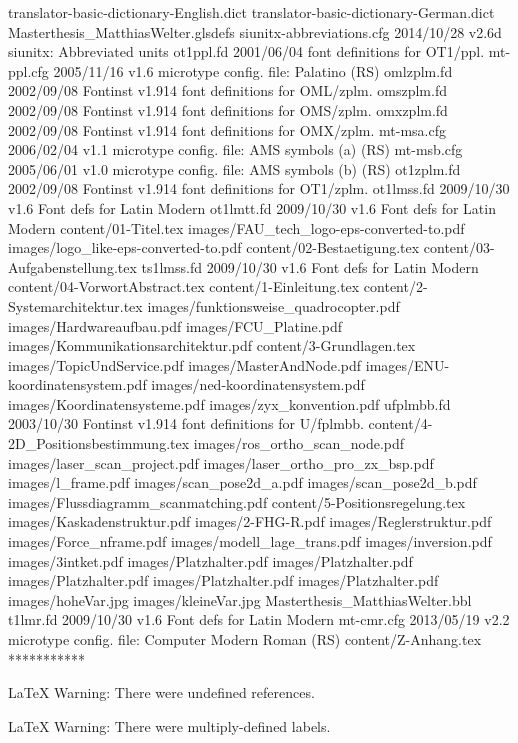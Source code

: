 translator-basic-dictionary-English.dict    
translator-basic-dictionary-German.dict    
Masterthesis_MatthiasWelter.glsdefs
siunitx-abbreviations.cfg    2014/10/28 v2.6d siunitx: Abbreviated units
  ot1ppl.fd    2001/06/04 font definitions for OT1/ppl.
  mt-ppl.cfg    2005/11/16 v1.6 microtype config. file: Palatino (RS)
 omlzplm.fd    2002/09/08 Fontinst v1.914 font definitions for OML/zplm.
 omszplm.fd    2002/09/08 Fontinst v1.914 font definitions for OMS/zplm.
 omxzplm.fd    2002/09/08 Fontinst v1.914 font definitions for OMX/zplm.
  mt-msa.cfg    2006/02/04 v1.1 microtype config. file: AMS symbols (a) (RS)
  mt-msb.cfg    2005/06/01 v1.0 microtype config. file: AMS symbols (b) (RS)
 ot1zplm.fd    2002/09/08 Fontinst v1.914 font definitions for OT1/zplm.
 ot1lmss.fd    2009/10/30 v1.6 Font defs for Latin Modern
 ot1lmtt.fd    2009/10/30 v1.6 Font defs for Latin Modern
content/01-Titel.tex
images/FAU_tech_logo-eps-converted-to.pdf
images/logo_like-eps-converted-to.pdf
content/02-Bestaetigung.tex
content/03-Aufgabenstellung.tex
 ts1lmss.fd    2009/10/30 v1.6 Font defs for Latin Modern
content/04-VorwortAbstract.tex
content/1-Einleitung.tex
content/2-Systemarchitektur.tex
images/funktionsweise_quadrocopter.pdf
images/Hardwareaufbau.pdf
images/FCU_Platine.pdf
images/Kommunikationsarchitektur.pdf
content/3-Grundlagen.tex
images/TopicUndService.pdf
images/MasterAndNode.pdf
images/ENU-koordinatensystem.pdf
images/ned-koordinatensystem.pdf
images/Koordinatensysteme.pdf
images/zyx_konvention.pdf
 ufplmbb.fd    2003/10/30 Fontinst v1.914 font definitions for U/fplmbb.
content/4-2D_Positionsbestimmung.tex
images/ros_ortho_scan_node.pdf
images/laser_scan_project.pdf
images/laser_ortho_pro_zx_bsp.pdf
images/l_frame.pdf
images/scan_pose2d_a.pdf
images/scan_pose2d_b.pdf
images/Flussdiagramm_scanmatching.pdf
content/5-Positionsregelung.tex
images/Kaskadenstruktur.pdf
images/2-FHG-R.pdf
images/Reglerstruktur.pdf
images/Force_nframe.pdf
images/modell_lage_trans.pdf
images/inversion.pdf
images/3intket.pdf
images/Platzhalter.pdf
images/Platzhalter.pdf
images/Platzhalter.pdf
images/Platzhalter.pdf
images/Platzhalter.pdf
images/hoheVar.jpg
images/kleineVar.jpg
Masterthesis_MatthiasWelter.bbl
   t1lmr.fd    2009/10/30 v1.6 Font defs for Latin Modern
  mt-cmr.cfg    2013/05/19 v2.2 microtype config. file: Computer Modern Roman (RS)
content/Z-Anhang.tex
 ***********


LaTeX Warning: There were undefined references.


LaTeX Warning: There were multiply-defined labels.


